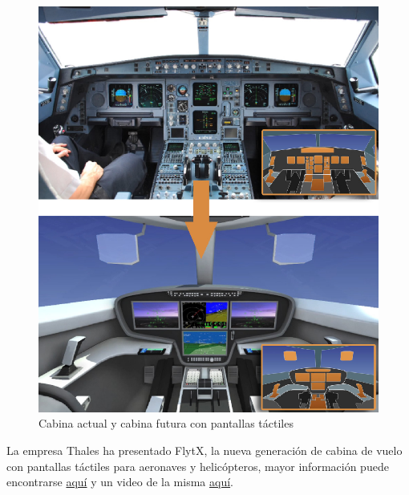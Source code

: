         \begin{figure}
          \centering
          \includegraphics[width=0.8\linewidth]{01.tablero.instrumentos/imagenes/1.4.pantalla.electronica/01_04_cabina_actual_vs_cabina_futura.png}
          \caption{Cabina actual y cabina futura con pantallas t\'actiles \protect\cite{Bonelli2011FlyingWC}}
          \label{fig:01.04.cabina.actual.vs.cabina.futura}
        \end{figure}


\begin{tcolorbox}
La empresa Thales ha presentado FlytX, la nueva generaci\'on de cabina de vuelo con pantallas t\'actiles para aeronaves y helic\'opteros, mayor informaci\'on puede encontrarse 
\href{https://www.thalesgroup.com/en/markets/aerospace/flight-deck-avionics-equipment-functions/flytx-tactile-large-display-flight-deck}{aqu\'i} 
y un video de la misma 
\href{https://www.youtube.com/watch?v=PcrEUL8ATgE}{aqu\'i}.
\end{tcolorbox}

